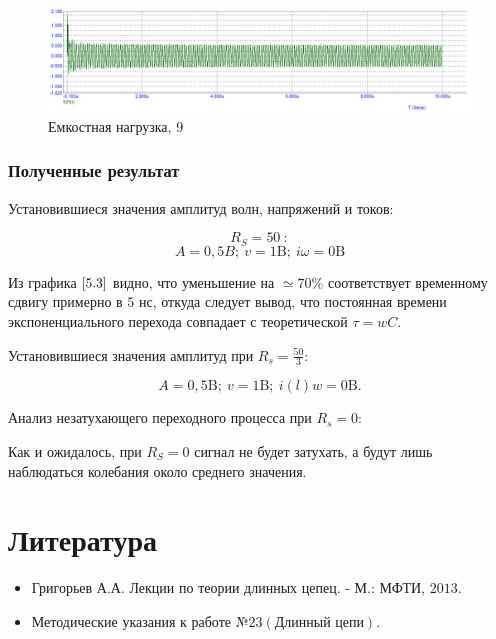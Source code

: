 \documentclass[a4paper, 14pt]{extarticle}%
\begin{document}
\begin{figure}[h!]
			\centering
			\includegraphics[width=1.1\linewidth]{./graphs/28.jpg}
			\caption{Емкостная нагрузка, 9}
			\label{5.9}
\end{figure}

\subsubsection{Полученные результат}

$\textbf{Установившиеся значения амплитуд волн, напряжений и токов:}$

\[ R_{S}=50\ :\]
\[  A=0,5 B;\ v=1 \text{B};\  i \omega=0 \text{B}\]

Из графика $\ref{5.3}$ видно, что уменьшение на $\simeq 70 \%$ соответствует временному сдвигу примерно в $5 \text{ нс}$, откуда следует вывод, что постоянная времени экспоненциального перехода совпадает с теоретической $\tau = wC$.

$\textbf{Установившиеся значения амплитуд при }R_s = \frac{50}{3}:$

\[ A = 0,5\text{B};\ v = 1\text{B};\ i(l)w = 0\text{B}.\]

$\textbf{Анализ незатухающего переходного процесса при } R_s = 0:$

Как и ожидалось, при $R_{S}=0$ сигнал не будет затухать, а будут лишь наблюдаться колебания около среднего значения.


\section{Литература}

\begin{itemize}

\item Григорьев А.А. Лекции по теории длинных цепец. - М.: МФТИ, $2013 .$

\item Методические указания к работе №$23 (\text{Длинный цепи})$.

\end{itemize}
\end{document}
